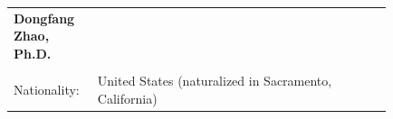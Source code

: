 \documentclass[11pt]{scrartcl}
\date{}
\newcommand{\arygap}{.9}
\begin{document}
\begin{table}[h]
{\def\arraystretch{\arygap}\tabcolsep=0pt
\begin{tabular}{p{0.13\linewidth}p{0.7\linewidth}} 

  \multirow{1}{*}{\LARGE \textbf{Dongfang Zhao, Ph.D.}} & \\
  & \\
  Nationality: & United States (naturalized in Sacramento, California) \\
  
  
  
  
  

\end{tabular}%
}
\end{table}
\end{document}

